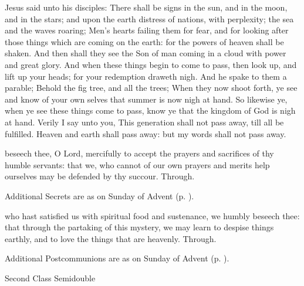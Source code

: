 Jesus said unto his disciples: There shall be signs in the sun, and in the moon, and in the stars; and upon the earth distress of nations, with perplexity; the sea and the waves roaring; Men's hearts failing them for fear, and for looking after those things which are coming on the earth: for the powers of heaven shall be shaken. And then shall they see the Son of man coming in a cloud with power and great glory. And when these things begin to come to pass, then look up, and lift up your heads; for your redemption draweth nigh. And he spake to them a parable; Behold the fig tree, and all the trees; When they now shoot forth, ye see and know of your own selves that summer is now nigh at hand. So likewise ye, when ye see these things come to pass, know ye that the kingdom of God is nigh at hand. Verily I say unto you, This generation shall not pass away, till all be fulfilled. Heaven and earth shall pass away: but my words shall not pass away.

\secret
{} beseech thee, O Lord, mercifully to accept the prayers and sacrifices of thy humble servants: that we, who cannot of our own prayers and merits help ourselves may be defended by thy succour. Through.
\begin{rubric}
    Additional Secrets are as on  Sunday of Advent (p. \pageref{AdventI}).
\end{rubric}
\postcommunion
{} who hast satisfied us with spiritual food and sustenance, we humbly beseech thee: that through the partaking of this mystery, we may learn to despise things earthly, and to love the things that are heavenly. Through.
\begin{rubric}
    Additional Postcommunions are as on  Sunday of Advent (p. \pageref{AdventI}).
\end{rubric}
\begin{inhead}
{Second Class Semidouble}
\end{inhead}
\par\noindent
{}


